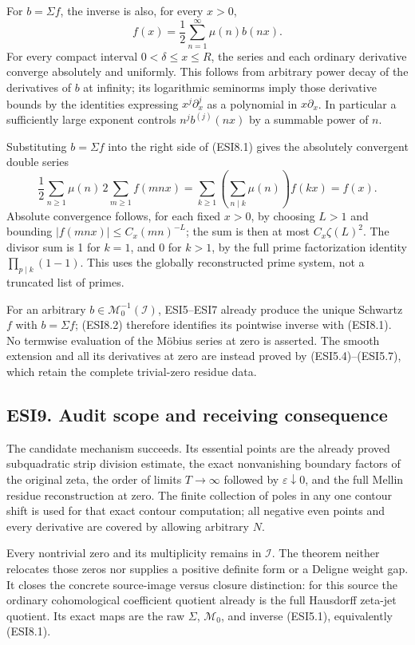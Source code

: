 For \(b=\Sigma f\), the inverse is also, for every \(x>0\), \[
\boxed{f(x)=\frac12\sum_{n=1}^\infty\mu(n)b(nx).}
\tag{ESI8.1}
\] For every compact interval \(0<\delta\le x\le R\), the series and
each ordinary derivative converge absolutely and uniformly. This follows
from arbitrary power decay of the derivatives of \(b\) at infinity; its
logarithmic seminorms imply those derivative bounds by the identities
expressing \(x^j\partial_x^j\) as a polynomial in \(x\partial_x\). In
particular a sufficiently large exponent controls \(n^j b^{(j)}(nx)\) by
a summable power of \(n\).

Substituting \(b=\Sigma f\) into the right side of (ESI8.1) gives the
absolutely convergent double series \[
\frac12\sum_{n\ge1}\mu(n)\,2\sum_{m\ge1}f(mnx)
=\sum_{k\ge1}\left(\sum_{n\mid k}\mu(n)\right)f(kx)=f(x).
\tag{ESI8.2}
\] Absolute convergence follows, for each fixed \(x>0\), by choosing
\(L>1\) and bounding \(|f(mnx)|\le C_x(mn)^{-L}\); the sum is then at
most \(C_x\zeta(L)^2\). The divisor sum is 1 for \(k=1\), and 0 for
\(k>1\), by the full prime factorization identity
\(\prod_{p\mid k}(1-1)\). This uses the globally reconstructed prime
system, not a truncated list of primes.

For an arbitrary \(b\in\mathcal M_0^{-1}(\mathcal I)\), ESI5--ESI7
already produce the unique Schwartz \(f\) with \(b=\Sigma f\); (ESI8.2)
therefore identifies its pointwise inverse with (ESI8.1). No termwise
evaluation of the Möbius series at zero is asserted. The smooth
extension and all its derivatives at zero are instead proved by
(ESI5.4)--(ESI5.7), which retain the complete trivial-zero residue data.

\subsection{ESI9. Audit scope and receiving
consequence}\label{esi9.-audit-scope-and-receiving-consequence}

The candidate mechanism succeeds. Its essential points are the already
proved subquadratic strip division estimate, the exact nonvanishing
boundary factors of the original zeta, the order of limits
\(T\to\infty\) followed by \(\varepsilon\downarrow0\), and the full
Mellin residue reconstruction at zero. The finite collection of poles in
any one contour shift is used for that exact contour computation; all
negative even points and every derivative are covered by allowing
arbitrary \(N\).

Every nontrivial zero and its multiplicity remains in \(\mathcal I\).
The theorem neither relocates those zeros nor supplies a positive
definite form or a Deligne weight gap. It closes the concrete
source-image versus closure distinction: for this source the ordinary
cohomological coefficient quotient already is the full Hausdorff
zeta-jet quotient. Its exact maps are the raw \(\Sigma\),
\(\mathcal M_0\), and inverse (ESI5.1), equivalently (ESI8.1).

